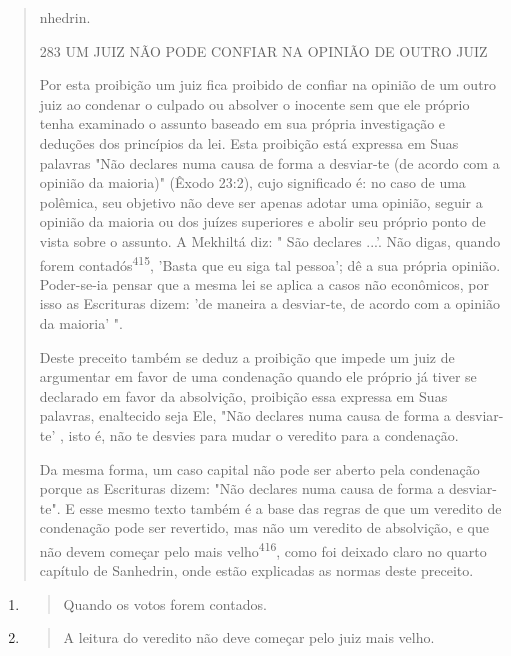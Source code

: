 \begin{quote}
nhedrin.

283 UM JUIZ NÃO PODE CONFIAR NA OPINIÃO DE OUTRO JUIZ

Por esta proibição um juiz fica proibido de confiar na opinião de um
outro juiz ao condenar o culpado ou absolver o inocente sem que ele
próprio tenha examinado o assunto baseado em sua própria investigação e
deduções dos princípios da lei. Esta proibição está expressa em Suas
palavras "Não decla­res numa causa de forma a desviar-te (de acordo com
a opinião da maioria)" (Êxodo 23:2), cujo significado é: no caso de uma
polêmica, seu objetivo não deve ser apenas adotar uma opinião, seguir a
opinião da maioria ou dos juízes superiores e abolir seu próprio ponto
de vista sobre o assunto. A Mekhiltá diz: " São declares ...'. Não
digas, quando forem contadós\textsuperscript{415}, 'Basta que eu siga
tal pessoa'; dê a sua própria opinião. Poder-se-ia pensar que a mesma
lei se apli­ca a casos não econômicos, por isso as Escrituras dizem: 'de
maneira a desviar-te, de acordo com a opinião da maioria' ".

Deste preceito também se deduz a proibição que impede um juiz de
argumentar em favor de uma condenação quando ele próprio já tiver se
decla­rado em favor da absolvição, proibição essa expressa em Suas
palavras, enalte­cido seja Ele, "Não declares numa causa de forma a
desviar-te' , isto é, não te desvies para mudar o veredito para a
condenação.

Da mesma forma, um caso capital não pode ser aberto pela conde­nação
porque as Escrituras dizem: "Não declares numa causa de forma a
desviar-te". E esse mesmo texto também é a base das regras de que um
veredito de condenação pode ser revertido, mas não um veredito de
absolvição, e que não devem começar pelo mais
velho\textsuperscript{416}, como foi deixado claro no quarto capítu­lo
de Sanhedrin, onde estão explicadas as normas deste preceito.
\end{quote}

\begin{enumerate}
\def\labelenumi{\arabic{enumi}.}
\setcounter{enumi}{414}
\item
  \begin{quote}
  Quando os votos forem contados.
  \end{quote}
\item
  \begin{quote}
  A leitura do veredito não deve começar pelo juiz mais velho.
  \end{quote}
\end{enumerate}


